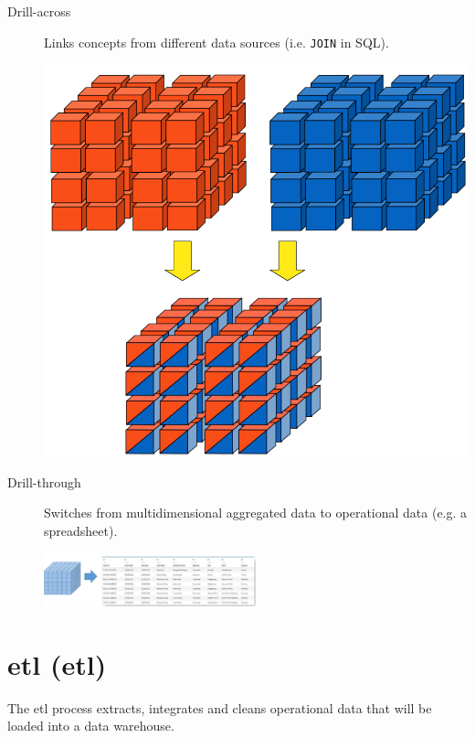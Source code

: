 \begin{description}
    \item[Drill-across] 
        \begin{minipage}{0.7\textwidth}
            Links concepts from different data sources (i.e. \texttt{JOIN} in SQL).
        \end{minipage}
        \hfill
        \begin{minipage}{0.15\textwidth}
            \centering
            \includegraphics[width=\linewidth]{img/olap_drillacross.png}
        \end{minipage}    
    
    \item[Drill-through] 
        Switches from multidimensional aggregated data to operational data (e.g. a spreadsheet).
        \begin{center}
            \includegraphics[width=0.5\textwidth]{img/olap_drillthrough.png}
        \end{center}    
\end{description}



\section{\Acl{etl} (\Acs{etl})}
The \Ac{etl} process extracts, integrates and cleans operational data that will be loaded into a data warehouse.


